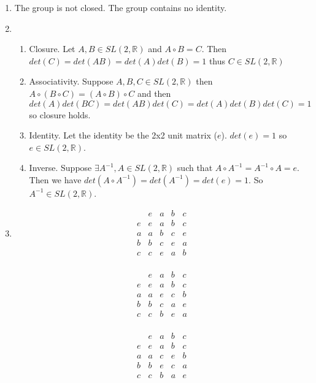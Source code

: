 \documentclass{article}
\begin{document}

\begin{enumerate}

\item 
The group is not closed. The group contains no identity.
\item
\begin{enumerate}
\item Closure. Let $A,B \in SL(2,\mathbb{R})$ and $A \circ B = C$. Then $det(C)=det(AB) = det(A)det(B)=1$ thus $C \in SL(2,\mathbb{R})$
\item Associativity. Suppose $A,B,C \in SL(2,\mathbb{R})$ then $A \circ (B \circ C) = (A \circ B) \circ C$ and then $det(A)det(BC)=det(AB)det(C) = det(A)det(B)det(C)=1$ so closure holds.
\item Identity. Let the identity be the 2x2 unit matrix ($e$). $det(e)=1$ so $e \in SL(2,\mathbb{R})$.
\item Inverse. Suppose $\exists A^{-1},A \in SL(2,\mathbb{R})$ such that $A \circ A^{-1} = A^{-1} \circ A = e$. Then we have $det(A \circ A^{-1}) = det(A^{-1}) = det(e) =1$. So $A^{-1}\in SL(2,\mathbb{R})$.
\end{enumerate}
\item
\[
    \begin{array}{l|*{4}{l}}
        & e   & a   & b & c  \\
    \hline
    e & e & a & b & c  \\
    a & a & b & c & e  \\
    b & b & c & e & a\\
    c & c & e & a & b  \\
    \end{array} 
\]

\[
    \begin{array}{l|*{4}{l}}
        & e   & a   & b & c  \\
    \hline
    e & e & a & b & c  \\
    a & a & e & c & b  \\
    b & b & c & a & e\\
    c & c & b & e & a  \\
    \end{array} 
\]

\[
    \begin{array}{l|*{4}{l}}
        & e   & a   & b & c  \\
    \hline
    e & e & a & b & c  \\
    a & a & c & e & b  \\
    b & b & e & c & a\\
    c & c & b & a & e  \\
    \end{array} 
\]


\end{enumerate}
\end{document}
